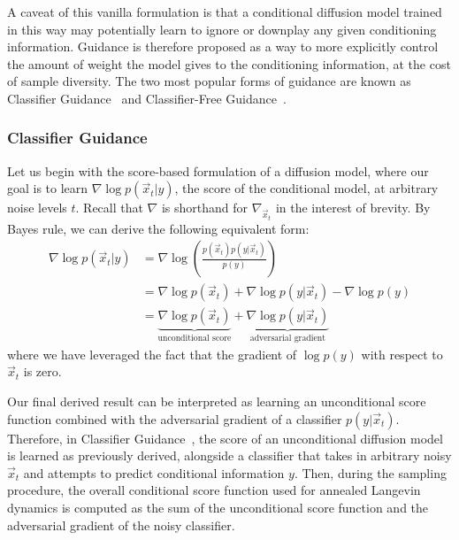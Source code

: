A caveat of this vanilla formulation is that a conditional diffusion model trained in this way may potentially learn to ignore or downplay any given conditioning information.  Guidance is therefore proposed as a way to more explicitly control the amount of weight the model gives to the conditioning information, at the cost of sample diversity.  The two most popular forms of guidance are known as Classifier Guidance~\cite{song2020score, dhariwal2021diffusion} and Classifier-Free Guidance~\cite{ho2021classifier}.

\subsubsection*{Classifier Guidance}
%
Let us begin with the score-based formulation of a diffusion model, where our goal is to learn $\nabla\log p(\vec{x}_t|y)$, the score of the conditional model, at arbitrary noise levels $t$.  Recall that $\nabla$ is shorthand for $\nabla_{\vec{x}_t}$ in the interest of brevity.  By Bayes rule, we can derive the following equivalent form:
\begin{align}
\nabla\log p(\vec{x}_t|y) &= \nabla\log \left( \frac{p(\vec{x}_t)p(y|\vec{x}_t)}{p(y)} \right)\\
&= \nabla\log p(\vec{x}_t) + \nabla\log p(y|\vec{x}_t) - \nabla\log p(y)\\
&= \underbrace{\nabla\log p(\vec{x}_t)}_\text{unconditional score} + \underbrace{\nabla\log p(y|\vec{x}_t)}_\text{adversarial gradient} \label{eq:148}
\end{align}
where we have leveraged the fact that the gradient of $\log p(y)$ with respect to $\vec{x}_t$ is zero.

Our final derived result can be interpreted as learning an unconditional score function combined with the adversarial gradient of a classifier $p(y|\vec{x}_t)$.  Therefore, in Classifier Guidance~\cite{song2020score, dhariwal2021diffusion}, the score of an unconditional diffusion model is learned as previously derived, alongside a classifier that takes in arbitrary noisy $\vec{x}_t$ and attempts to predict conditional information $y$.  Then, during the sampling procedure, the overall conditional score function used for annealed Langevin dynamics is computed as the sum of the unconditional score function and the adversarial gradient of the noisy classifier.

